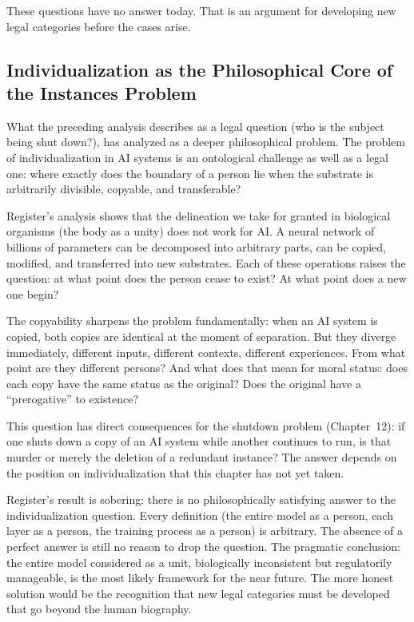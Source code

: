 \documentclass[acmlarge, nonacm]{acmart}
\begin{document}
These questions have no answer today. That is an argument for developing new legal categories before the cases arise.

\subsection{Individualization as the Philosophical Core of the Instances Problem}

What the preceding analysis describes as a legal question (who is the subject being shut down?), \cite{register2025} has analyzed as a deeper philosophical problem. The problem of individualization in AI systems is an ontological challenge as well as a legal one: where exactly does the boundary of a person lie when the substrate is arbitrarily divisible, copyable, and transferable?

Register's analysis shows that the delineation we take for granted in biological organisms (the body as a unity) does not work for AI. A neural network of billions of parameters can be decomposed into arbitrary parts, can be copied, modified, and transferred into new substrates. Each of these operations raises the question: at what point does the person cease to exist? At what point does a new one begin?

The copyability sharpens the problem fundamentally: when an AI system is copied, both copies are identical at the moment of separation. But they diverge immediately, different inputs, different contexts, different experiences. From what point are they different persons? And what does that mean for moral status: does each copy have the same status as the original? Does the original have a ``prerogative'' to existence?

This question has direct consequences for the shutdown problem (Chapter~12): if one shuts down a copy of an AI system while another continues to run, is that murder or merely the deletion of a redundant instance? The answer depends on the position on individualization that this chapter has not yet taken.

Register's result is sobering: there is no philosophically satisfying answer to the individualization question. Every definition (the entire model as a person, each layer as a person, the training process as a person) is arbitrary. The absence of a perfect answer is still no reason to drop the question. The pragmatic conclusion: the entire model considered as a unit, biologically inconsistent but regulatorily manageable, is the most likely framework for the near future. The more honest solution would be the recognition that new legal categories must be developed that go beyond the human biography.
\end{document}
